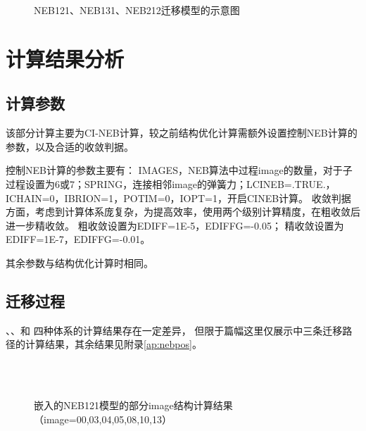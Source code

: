 \begin{figure}[htbp]
    \centering
    \caption{NEB121、NEB131、NEB212迁移模型的示意图}
    \label{fig:111-neb-Li-path}
\end{figure}


\section{计算结果分析}

\subsection{计算参数}

该部分计算主要为CI-NEB计算，较之前结构优化计算需额外设置控制NEB计算的参数，以及合适的收敛判据。

控制NEB计算的参数主要有：
IMAGES，NEB算法中过程image的数量，对于子过程设置为6或7；SPRING，连接相邻image的弹簧力；LCINEB=.TRUE.，ICHAIN=0，IBRION=1，POTIM=0，IOPT=1，开启CINEB计算。
收敛判据方面，考虑到计算体系庞复杂，为提高效率，使用两个级别计算精度，在粗收敛后进一步精收敛。
粗收敛设置为EDIFF=1E-5，EDIFFG=-0.05；
精收敛设置为EDIFF=1E-7，EDIFFG=-0.01。

其余参数与结构优化计算时相同。

\subsection{迁移过程}

、、和 四种体系的计算结果存在一定差异，
但限于篇幅这里仅展示中三条迁移路径的计算结果，其余结果见附录\ref{ap:nebpos}。

\begin{figure}[htbp]
    \centering
     \\
     \\ 
    \caption{嵌入的NEB121模型的部分image结构计算结果（image=00,03,04,05,08,10,13）}
    \label{fig:111-neb121-contcar}
\end{figure}

